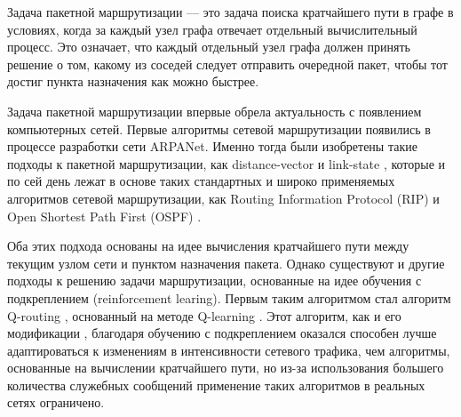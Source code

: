 \documentclass[specification, annotation]{itmo-student-thesis}
\begin{document}
\graphicspath{{img/}}


\tableofcontents

\startprefacepage

Задача пакетной маршрутизации --- это задача поиска кратчайшего пути в графе в условиях,
когда за каждый узел графа отвечает отдельный вычислительный процесс. Это
означает, что каждый отдельный узел графа должен принять решение о том, какому
из соседей следует отправить очередной пакет, чтобы тот достиг пункта назначения
как можно быстрее.

Задача пакетной маршрутизации впервые обрела актуальность с появлением
компьютерных сетей. Первые алгоритмы сетевой маршрутизации появились в процессе
разработки сети ARPANet. Именно тогда были изобретены такие подходы к пакетной
маршрутизации, как distance-vector \cite{arpanet-orig} и
link-state \cite{link-state-arpanet}, которые и по сей день лежат в основе таких
стандартных и широко применяемых алгоритмов сетевой маршрутизации, как Routing
Information Protocol (RIP) \cite{rip-rfc} и Open Shortest Path First (OSPF) \cite{ospf-rfc}.

Оба этих подхода основаны на идее вычисления кратчайшего пути между текущим
узлом сети и пунктом назначения пакета. Однако существуют и другие подходы к
решению задачи маршрутизации, основанные на идее обучения с подкреплением
(reinforcement learing). Первым таким алгоритмом стал алгоритм
Q-routing \cite{q-routing-orig}, основанный на методе
Q-learning \cite{q-learning-orig}. Этот алгоритм, как и его
модификации \cite{predictive-q-routing, dual-q-routing},
благодаря обучению с подкреплением оказался способен лучше адаптироваться к
изменениям в интенсивности сетевого трафика, чем алгоритмы, основанные на
вычислении кратчайшего пути, но из-за использования большего количества
служебных сообщений применение таких алгоритмов в реальных сетях ограничено.
\end{document}
